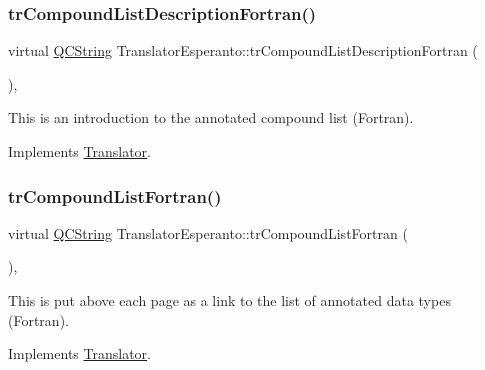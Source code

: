 \mbox{\label{class_translator_esperanto_a8f45ee46afb9c344bcac707fdea19978}} 
\subsubsection{\texorpdfstring{trCompoundListDescriptionFortran()}{trCompoundListDescriptionFortran()}}
{\footnotesize\ttfamily virtual \mbox{\hyperlink{class_q_c_string}{Q\+C\+String}} Translator\+Esperanto\+::tr\+Compound\+List\+Description\+Fortran (\begin{DoxyParamCaption}{ }\end{DoxyParamCaption})\hspace{0.3cm}{\ttfamily [inline]}, {\ttfamily [virtual]}}

This is an introduction to the annotated compound list (Fortran). 

Implements \mbox{\hyperlink{class_translator}{Translator}}.

\mbox{\label{class_translator_esperanto_aa092624e80f31849f9bdea2bb9525a74}} 
\subsubsection{\texorpdfstring{trCompoundListFortran()}{trCompoundListFortran()}}
{\footnotesize\ttfamily virtual \mbox{\hyperlink{class_q_c_string}{Q\+C\+String}} Translator\+Esperanto\+::tr\+Compound\+List\+Fortran (\begin{DoxyParamCaption}{ }\end{DoxyParamCaption})\hspace{0.3cm}{\ttfamily [inline]}, {\ttfamily [virtual]}}

This is put above each page as a link to the list of annotated data types (Fortran). 

Implements \mbox{\hyperlink{class_translator}{Translator}}.

\mbox{\label{class_translator_esperanto_ad69f34aac00b6774393c27d8044f195c}} 
